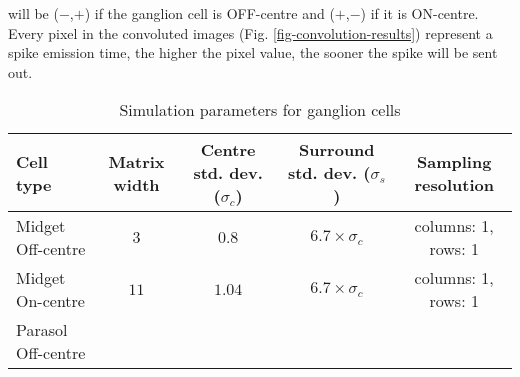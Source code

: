 will be ($-$,$+$) if the ganglion cell is OFF-centre and ($+$,$-$) if it is 
ON-centre.\\
Every pixel in the convoluted images (Fig. \ref{fig-convolution-results}) 
represent a spike emission time, the higher the pixel value, the sooner the 
spike will be sent out.
\begin{table}[htb]
  \caption{Simulation parameters for ganglion cells}
  \centering
  \begin{tabular}{l c c c c}
    \begin{minipage}{1.2cm}Cell type \end{minipage}& 
    \begin{minipage}{1cm} \centering Matrix width \end{minipage}&  
    \begin{minipage}{1.3cm}\centering Centre std. dev. ($\sigma_c$)\end{minipage} & 
    \begin{minipage}{1.3cm}\centering Surround std. dev. ($\sigma_s$)\end{minipage} & 
    \begin{minipage}{1.2cm}\centering Sampling resolution\end{minipage} \\
    \hline
    \begin{minipage}{1.2cm}\vspace*{0.1cm} Midget Off-centre \vspace*{0.005cm} \end{minipage}& 
    \begin{minipage}{1cm}\centering$3$ \end{minipage}& 
    $0.8$ & $6.7 \times \sigma_c$ &  
    \begin{minipage}{1.4cm}columns: 1, rows: 1\end{minipage}\\
    \begin{minipage}{1.2cm} Midget On-centre \vspace*{0.005cm}\end{minipage} & 
    \begin{minipage}{1cm}\centering $11$ \end{minipage}& 
    $1.04$ & $6.7 \times \sigma_c$ &  
    \begin{minipage}{1.4cm}columns: 1, rows: 1\end{minipage}\\
    \begin{minipage}{1.2cm}Parasol Off-centre \vspace*{0.005cm}\end{minipage} & 

\end{tabular}
\end{table}
